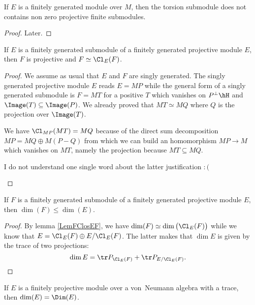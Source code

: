 \begin{proposition}
If $E$ is a finitely generated module over $M$, then the torsion submodule does not contains non zero projective finite submodules.
\end{proposition}

\begin{proof}
Later.
\end{proof}


\begin{lemma}			\label{LemFClosEF}
If $E$ is a finitely generated submodule of a finitely generated projective module $E$, then $F$ is projective and $F\simeq \Cl_E(F)$.
\end{lemma}

\begin{proof}
We assume as usual that $E$ and $F$ are singly generated. The singly generated projective module $E$ reads $E=MP$ while the general form of a singly generated submodule is $F=MT$ for a positive $T$ which vanishes on $P^{\perp}\hH$ and $\Image(T)\subseteq\Image(P)$. We already proved that $MT\simeq MQ$ where $Q$ is the projection over $\Image(T)$.

We have $\Cl_{MP}(MT)=MQ$ because of the direct sum decomposition $MP=MQ\oplus M(P-Q)$ from which we can build an homomorphism $MP\to M$ which vanishes on $MT$, namely the projection  because $MT\subseteq MQ$.
\begin{probleme}
I do not understand one single word about the latter justification $:($
\end{probleme}
\end{proof}

\begin{corollary}		\label{Corfgfgdilleqdim}
If $F$ is a finitely generated submodule of a finitely generated projective module $E$, then $\dim(F)\leq\dim(E)$.
\end{corollary}

\begin{proof}
By lemma \ref{LemFClosEF}, we have $\dim(F)\simeq\dim\big( \Cl_E(F) \big)$ while we know that $E=\Cl_E(F)\oplus E/\Cl_E(F)$. The latter makes that $\dim E$ is given by the trace of two projections:
\begin{equation}
	\dim E=\tr P_{\Cl_E(F)}+\tr P_{E/\Cl_E(F)}.
\end{equation}
\end{proof}

\begin{corollary}
If $E$ is a finitely projective module over a von~Neumann algebra with a trace, then $\dim(E)=\Dim(E)$. 
\end{corollary}

